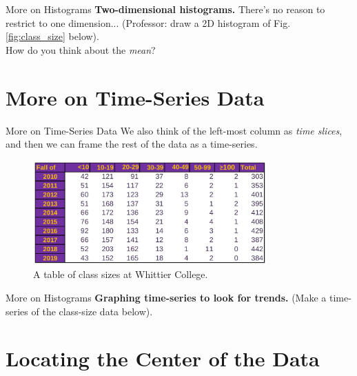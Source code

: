 \documentclass{beamer}
\begin{document}
\begin{frame}{More on Histograms}
\textbf{Two-dimensional histograms.}  There's no reason to restrict to one dimension... (Professor: draw a 2D histogram of Fig. \ref{fig:class_size} below). \\ \vspace{6cm}
How do you think about the \textit{mean}?
\end{frame}

\section{More on Time-Series Data}

\begin{frame}{More on Time-Series Data}
We also think of the left-most column as \textit{time slices}, and then we can frame the rest of the data as a time-series.
\begin{figure}
\centering
\includegraphics[width=0.8\textwidth]{figures/class_size.png}
\caption{\label{fig:class_size2} A table of class sizes at Whittier College.}
\end{figure}
\end{frame}

\begin{frame}{More on Histograms}
\textbf{Graphing time-series to look for trends.} (Make a time-series of the class-size data below). \\ \vspace{6cm}
\end{frame}

\section{Locating the Center of the Data}
\end{document}
